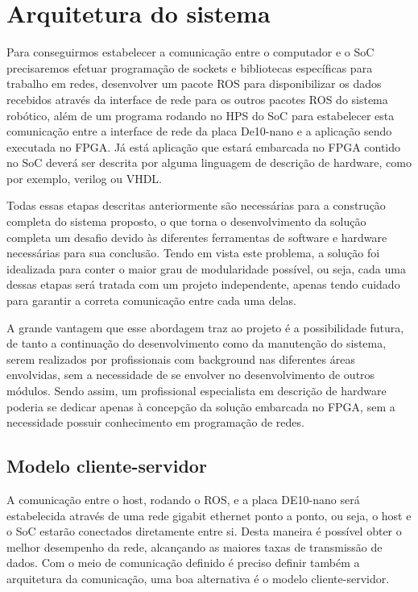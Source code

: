 \chapter{Arquitetura do sistema}

Para conseguirmos estabelecer a comunicação entre o computador e o SoC precisaremos efetuar programação de sockets e bibliotecas específicas para trabalho em redes, desenvolver um pacote ROS para disponibilizar os dados recebidos através da interface de rede para os outros pacotes ROS do sistema robótico, além de um programa rodando no HPS do SoC para estabelecer esta comunicação entre a interface de rede da placa De10-nano e a aplicação sendo executada no FPGA. Já está aplicação que estará embarcada no FPGA contido no SoC deverá ser descrita por alguma linguagem de descrição de hardware, como por exemplo, verilog ou VHDL.

Todas essas etapas descritas anteriormente são necessárias para a construção completa do sistema proposto, o que torna o desenvolvimento da solução completa um desafio devido às diferentes ferramentas de software e hardware necessárias para sua conclusão. Tendo em vista este problema, a solução foi idealizada para conter o maior grau de modularidade possível, ou seja, cada uma dessas etapas será tratada com um projeto independente, apenas tendo cuidado para garantir a correta comunicação entre cada uma delas.

A grande vantagem que esse abordagem traz ao projeto é a possibilidade futura, de tanto a continuação do desenvolvimento como da manutenção do sistema, serem realizados por profissionais com background nas diferentes áreas envolvidas, sem a necessidade de se envolver no desenvolvimento de outros módulos. Sendo assim, um profissional especialista em descrição de hardware poderia se dedicar apenas à concepção da solução embarcada no FPGA, sem a necessidade possuir conhecimento em programação de redes. 

\section{Modelo cliente-servidor}
A comunicação entre o host, rodando o ROS, e a placa DE10-nano será estabelecida através de uma rede gigabit ethernet ponto a ponto, ou seja, o host e o SoC estarão conectados diretamente entre si. Desta maneira é possível obter o melhor desempenho da rede, alcançando as maiores taxas de transmissão de dados. Com o meio de comunicação definido é preciso definir também a arquitetura da comunicação, uma boa alternativa é o modelo cliente-servidor.

